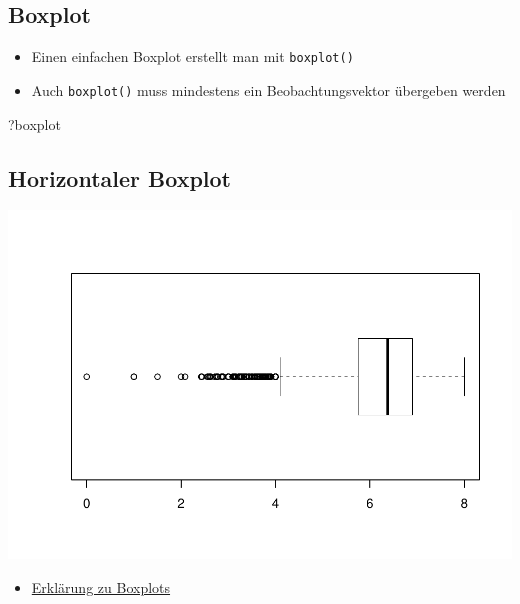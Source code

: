 \documentclass[]{article}
\newenvironment{Shaded}{\begin{snugshade}}{\end{snugshade}}
\newcommand{\KeywordTok}[1]{\textcolor[rgb]{0.13,0.29,0.53}{\textbf{{#1}}}}
\newcommand{\DataTypeTok}[1]{\textcolor[rgb]{0.13,0.29,0.53}{{#1}}}
\newcommand{\OtherTok}[1]{\textcolor[rgb]{0.56,0.35,0.01}{{#1}}}
\newcommand{\NormalTok}[1]{{#1}}
\providecommand{\tightlist}{%
  \setlength{\itemsep}{0pt}\setlength{\parskip}{0pt}}
\begin{document}
\subsection{Boxplot}\label{boxplot}

\begin{itemize}
\tightlist
\item
  Einen einfachen Boxplot erstellt man mit \texttt{boxplot()}
\item
  Auch \texttt{boxplot()} muss mindestens ein Beobachtungsvektor
  übergeben werden
\end{itemize}

\begin{Shaded}
\begin{Highlighting}[]
\NormalTok{?boxplot}
\end{Highlighting}
\end{Shaded}

\subsection{Horizontaler Boxplot}\label{horizontaler-boxplot}

\begin{Shaded}
\end{Shaded}

\includegraphics{Intro_Datenanalyse1_files/figure-latex/unnamed-chunk-152-1.pdf}

\begin{itemize}
\tightlist
\item
  \href{http://edoc.hu-berlin.de/dissertationen/gruenwald-andreas-2005-01-17/HTML/chapter2.html}{Erklärung
  zu Boxplots}
\end{itemize}
\end{document}
